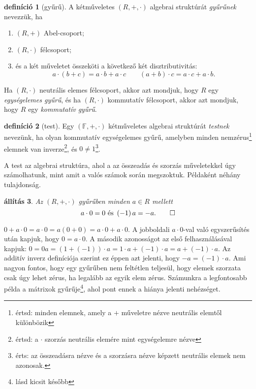 \documentclass[9pt, a4paper, showtrims]{memoir}
\makeatletter
\renewenvironment{proof}[1][\proofname]
    {\par\pushQED{\qed}%
    \normalfont \topsep6\p@\@plus6\p@\relax
    \trivlist
    \item[\hskip\labelsep
        \itshape
    #1\@addpunct{:}]\ignorespaces}
    {\popQED\endtrivlist\@endpefalse}
\theoremstyle{plain}
\newtheorem{proposition}{állítás}[chapter]
\theoremstyle{remark}
\theoremstyle{definition}
\newtheorem{definition}[proposition]{definíció}
\makeatother
\begin{document}
\begin{definition}[gyűrű]
    A kétműveletes $\left( R,+,\cdot \right)$ algebrai struktúrát \emph{gyűrűnek} nevezzük,
    ha
    \begin{enumerate}
        \item $\left( R,+ \right)$ Abel-csoport;
        \item $\left( R,\cdot \right)$ félcsoport;
        \item és a két műveletet összeköti a következő két disztributivitás:
            \[
                a\cdot\left( b+c \right)=a\cdot b + a\cdot c\qquad
                \left( a + b \right)\cdot c=a\cdot c+a\cdot b.
            \]
    \end{enumerate}
    Ha $\left( R,\cdot \right)$ neutrális elemes félcsoport, akkor azt mondjuk, hogy $R$ egy
    \emph{egységelemes gyűrű}, és ha $\left( R,\cdot \right)$ kommutatív félcsoport, akkor
    azt mondjuk, hogy $R$ egy \emph{kommutatív gyűrű}.
\end{definition}
\begin{definition}[test]
    Egy $\left( \mathbb{F},+,\cdot \right)$ kétműveletes algebrai struktúrát \emph{testnek}
    nevezünk, 
    ha olyan kommutatív egységelemes gyűrű, 
    amelyben minden nemzérus\footnote{értsd: minden elemnek, amely a $+$ műveletre nézve neutrális elemtől különbözik}
    elemnek van inverze\footnote{értsd: a $\cdot$ szorzás neutrális elemére mint egységelemre nézve}, 
    és $0\neq 1$\footnote{érts: az összeadásra nézve és a szorzásra nézve képzett neutrális elemek nem azonosak.}.
\end{definition}
A test az algebrai struktúra, ahol a az összeadás és szorzás műveletekkel úgy számolhatunk, mint amit a valós számok során megszoktuk.
Példaként néhány tulajdonság.
\begin{proposition}
    Az $\left( R,+,\cdot \right)$ gyűrűben minden $a\in R$ mellett 
    \begin{equation*}
        a\cdot 0=0\text{ és }
        \left( -1 \right)a=-a.\qedhere
    \end{equation*}
\end{proposition}
\begin{proof}
    \begin{math}
        0+a\cdot 0=
        a\cdot 0=
        a\left( 0+0 \right)=
        a\cdot 0+a\cdot 0.
    \end{math}
    A jobboldali $a\cdot 0$-val való egyszerűsítés után kapjuk, 
    hogy $0=a\cdot 0$.
    A második azonosságot az első felhasználásával kapjuk:
    \begin{math}
        0
        =
        0a
        =
        \left( 1+\left( -1 \right) \right)\cdot a
        =
        1\cdot a + \left( -1 \right)\cdot a
        =
        a +\left( -1 \right)\cdot a.
    \end{math}
    Az additív inverz definíciója szerint ez éppen azt jelenti, hogy $-a=\left( -1 \right)\cdot a$.
\end{proof}
Ami nagyon fontos, hogy egy gyűrűben nem feltétlen teljesül, 
hogy elemek szorzata csak úgy lehet zérus, ha legalább az egyik elem zérus.
Számunkra a legfontosabb példa  a mátrixok gyűrűje\footnote{lásd kicsit később},
ahol pont ennek a hiánya jelenti nehézséget.
\end{document}
